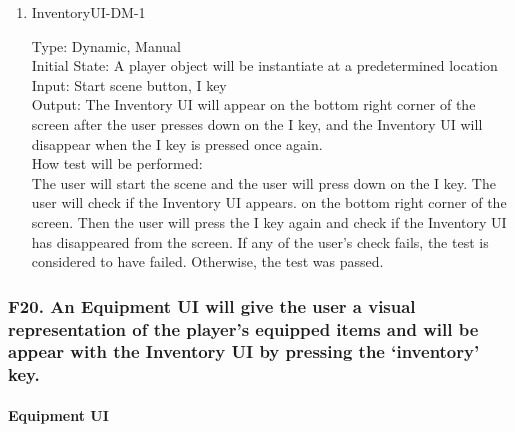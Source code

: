 \documentclass[12pt, titlepage]{article}
\newcounter{ftnum}
\begin{document}
\begin{enumerate}

\item{{\color{magenta} InventoryUI-DM-1}\\}  \label{F19-1}

{\color{magenta} Type: Dynamic, Manual}  \\
					
{\color{magenta} Initial State: A player object will be instantiate at a predetermined location}\\
					
{\color{magenta} Input: Start scene button,  I key}\\
					
{\color{magenta} Output: The Inventory UI will appear on the bottom right corner of the screen after the user presses down on the I key, and the Inventory UI will disappear when the I key is pressed once again.}\\
					
{\color{magenta} How test will be performed:}\\  {\color{magenta} The user will start the scene and the user will press down on the I key. The user will check if the Inventory UI appears. on the bottom right corner of the screen. Then the user will press the I key again and check if the Inventory UI has disappeared from the screen. If any of the user's check fails, the test is considered to have failed. Otherwise, the test was passed.}\\

\end{enumerate}

\subsubsection{{\color{magenta} F20. An Equipment UI will give the user a visual representation of the player's equipped items and will be appear with the Inventory UI by pressing the ‘inventory’ key.}} 

\paragraph{{\color{magenta} Equipment UI}}
\end{document}
